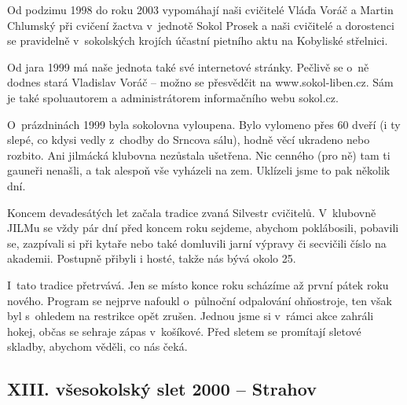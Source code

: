 \documentclass[a5paper, 11pt, twoside]{article}
\begin{document}
Od podzimu 1998 do roku 2003 vypomáhají naši cvičitelé Vláďa Voráč a
Martin Chlumský při cvičení žactva v~jednotě Sokol Prosek a naši
cvičitelé a dorostenci se pravidelně v~sokolských krojích účastní
pietního aktu na Kobyliské střelnici.

Od jara 1999 má naše jednota také své internetové stránky. Pečlivě se
o~ně dodnes stará Vladislav Voráč -- možno se přesvědčit na www.sokol-liben.cz. Sám je také
spoluautorem a administrátorem informačního webu sokol.cz.

O~prázdninách 1999 byla sokolovna vyloupena. Bylo vylomeno přes 60 dveří
(i ty slepé, co kdysi vedly z~chodby do Srncova sálu), hodně věcí
ukradeno nebo rozbito. Ani jilmácká klubovna nezůstala ušetřena. Nic
cenného (pro ně) tam ti gauneři nenašli, a tak alespoň vše vyházeli na
zem. Uklízeli jsme to pak několik dní.

Koncem devadesátých let začala tradice zvaná Silvestr cvičitelů.
V~klubovně JILMu se vždy pár dní před koncem roku sejdeme, abychom
poklábosili, pobavili se, zazpívali si při kytaře nebo také domluvili
jarní výpravy či secvičili číslo na akademii. Postupně přibyli i hosté,
takže nás bývá okolo 25.

I~tato tradice přetrvává. Jen se místo konce roku scházíme až první
pátek roku nového. Program se nejprve nafoukl o~půlnoční odpalování
ohňostroje, ten však byl s~ohledem na restrikce opět zrušen. Jednou jsme
si v~rámci akce zahráli hokej, občas se sehraje zápas v~košíkové. Před
sletem se promítají sletové skladby, abychom věděli, co nás čeká.

\subsection{XIII. všesokolský slet 2000 --
Strahov}
\end{document}
